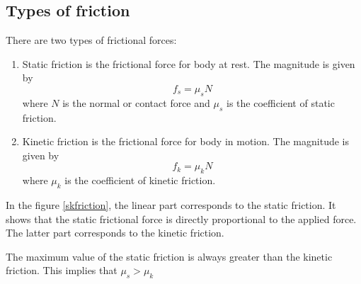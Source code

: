 \documentclass[10pt]{article}
\begin{document}
\subsection{Types of friction}
There are two types of frictional forces: 
\begin{enumerate}
\item Static friction is  the frictional force for body at rest.  The magnitude is given by
  \begin{equation}
    f_s=\mu_sN
  \end{equation}
where $N$ is the normal or contact force and $\mu_s$ is the coefficient of static friction.
\item Kinetic friction is the frictional force for body in motion. The magnitude is given by
  \begin{equation}
    f_k=\mu_kN
  \end{equation}
where $\mu_k$ is the coefficient of kinetic friction.
\end{enumerate}

In the figure \ref{skfriction}, the linear part corresponds to the static friction. It shows that the static frictional force is directly proportional to the applied force.  The latter part corresponds to the kinetic friction.

The maximum value of the static friction is always greater than the kinetic friction.  This implies that $\mu_s>\mu_k$
\end{document}
